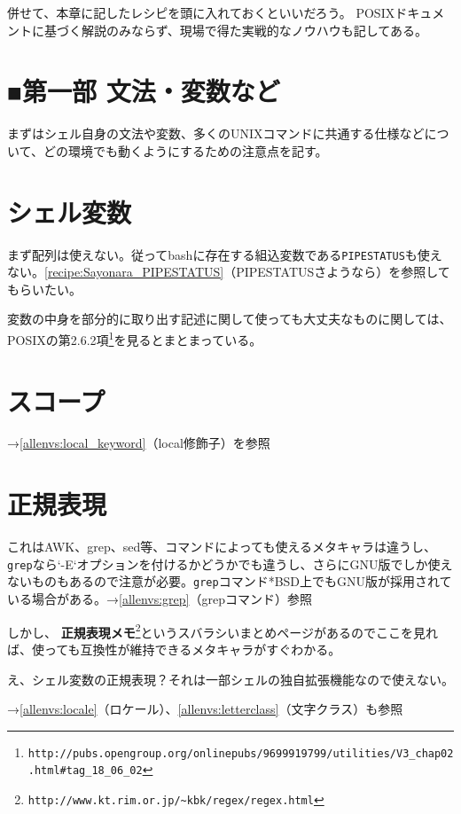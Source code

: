 併せて、本章に記したレシピを頭に入れておくといいだろう。
POSIXドキュメントに基づく解説のみならず、現場で得た実戦的なノウハウも記してある。

\section*{■第一部 文法・変数など}

まずはシェル自身の文法や変数、多くのUNIXコマンドに共通する仕様などについて、どの環境でも動くようにするための注意点を記す。

\section{シェル変数}

まず配列は使えない。従ってbashに存在する組込変数である\verb|PIPESTATUS|も使えない。\ref{recipe:Sayonara_PIPESTATUS}（PIPESTATUSさようなら）を参照してもらいたい。

変数の中身を部分的に取り出す記述に関して使っても大丈夫なものに関しては、POSIXの第2.6.2項\footnote{\verb|http://pubs.opengroup.org/onlinepubs/9699919799/utilities/V3_chap02.html#tag_18_06_02|}を見るとまとまっている。

\section{スコープ}

\noindent
→\ref{allenvs:local_keyword}（local修飾子）を参照

\section{正規表現}
\label{allenvs:regexp}

これはAWK、grep、sed等、コマンドによっても使えるメタキャラは違うし、\verb|grep|なら`-E`オプションを付けるかどうかでも違うし、さらにGNU版でしか使えないものもあるので注意が必要。\verb|grep|コマンド*BSD上でもGNU版が採用されている場合がある。→\ref{allenvs:grep}（grepコマンド）参照

しかし、 \textbf{正規表現メモ}\footnote{\verb|http://www.kt.rim.or.jp/~kbk/regex/regex.html|}というスバラシいまとめページがあるのでここを見れば、使っても互換性が維持できるメタキャラがすぐわかる。

え、シェル変数の正規表現？それは一部シェルの独自拡張機能なので使えない。

\noindent
→\ref{allenvs:locale}（ロケール）、\ref{allenvs:letterclass}（文字クラス）も参照

